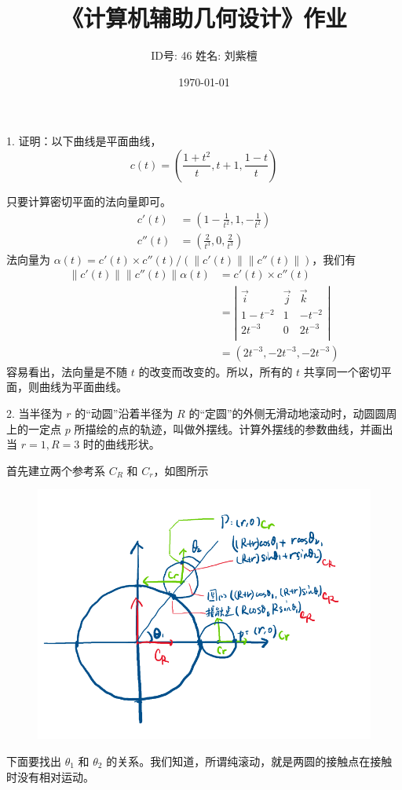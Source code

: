 ﻿\documentclass{article}
\begin{document}
\title{《计算机辅助几何设计》作业}
\author{ID号: 46  \qquad  姓名: 刘紫檀}  %
\date{\today}
\maketitle

1. 证明：以下曲线是平面曲线，
$$
c(t) = (\frac{1 + t^2}{t}, t + 1, \frac{1-t}{t})
$$

只要计算密切平面的法向量即可。
\begin{align*}
c'(t) &= (1 - \frac{1}{t^2}, 1, -\frac{1}{t^2}) \\
c''(t) &= (\frac{2}{t^3}, 0, \frac{2}{t^3})
\end{align*}
法向量为 $ \alpha(t) = c'(t) \times c''(t) / (\|c'(t)\| \|c''(t)\|) $，我们有
\begin{align*}
	\|c'(t)\| \|c''(t)\| \alpha(t)
	&= c'(t) \times c''(t) \\
	&= \left| \begin{matrix}
		\vec{i} & \vec{j} & \vec{k} \\
		1-t^{-2} & 1 & -t^{-2} \\
		2t^{-3} & 0 & 2t^{-3} \\
	\end{matrix} \right|\\
	&= (2t^{-3}, -2t^{-3}, -2t^{-3})
\end{align*}
容易看出，法向量是不随 $ t $ 的改变而改变的。所以，所有的 $ t $ 共享同一个密切平面，则曲线为平面曲线。

2. 当半径为 $r$ 的“动圆”沿着半径为 $R$ 的“定圆”的外侧无滑动地滚动时，动圆圆周上的一定点 $p$ 所描绘的点的轨迹，叫做外摆线。计算外摆线的参数曲线，并画出当 $r = 1, R = 3$ 时的曲线形状。


首先建立两个参考系 $ C_R $ 和 $ C_r $，如图所示
\begin{figure}[H]
	\centering
	\includegraphics[width=\textwidth]{fig-1}\\
	\label{fig:fig-1}
\end{figure}
下面要找出 $ \theta_1 $ 和 $ \theta_2 $ 的关系。我们知道，所谓纯滚动，就是两圆的接触点在接触时没有相对运动。
\end{document}
